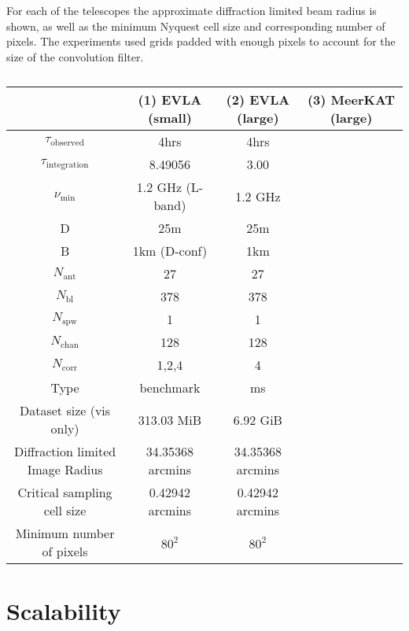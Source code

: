 For each of the telescopes the approximate diffraction limited beam radius is shown, as well as the minimum Nyquest cell size and corresponding number of pixels. The experiments used grids padded
with enough pixels to account for the size of the convolution filter.
\begin{table}[ht]
  \centering
  \begin{tabular}[c]{|c||c|c|c|}
  \hline
  & (1) EVLA (small) & (2) EVLA (large) & (3) MeerKAT (large) \\
  \hline
  $\tau_\text{observed}$ & 4hrs & 4hrs &\\
  \hline
  $\tau_\text{integration}$ & 8.49056 & 3.00 &\\
  \hline
  $\nu_\text{min}$ & 1.2 GHz (L-band) & 1.2 GHz &\\
  \hline
  D & 25m & 25m &\\
  \hline
  B & 1km (D-conf) & 1km &\\
  \hline
  $N_\text{ant}$ & 27 & 27 &\\
  \hline
  $N_\text{bl}$ & 378 & 378 &\\
  \hline
  $N_\text{spw}$ & 1 & 1 &\\
  \hline
  $N_\text{chan}$ & 128 & 128 &\\
  \hline
  $N_\text{corr}$ & 1,2,4 & 4 &\\
  \hline
  Type & benchmark & ms &\\
  \hline
  Dataset size (vis only) & 313.03 MiB & 6.92 GiB &\\
  \hline
  Diffraction limited Image Radius & 34.35368 arcmins & 34.35368 arcmins &\\
  \hline
  Critical sampling cell size & 0.42942 arcmins & 0.42942 arcmins &\\
  \hline
  Minimum number of pixels & $80^2$ & $80^2$ &\\
  \hline
  \end{tabular}
  \caption[]{}
  \label{tbl_datasets}
\end{table}
\section{Scalability}
